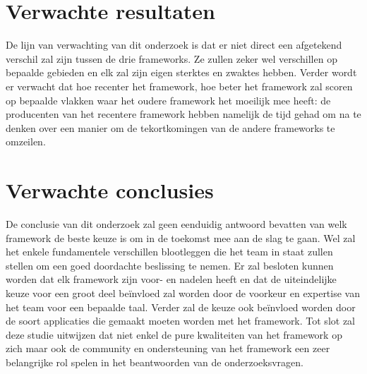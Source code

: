 \section{Verwachte resultaten}
\label{sec:verwachte_resultaten}

De lijn van verwachting van dit onderzoek is dat er niet direct een afgetekend verschil zal zijn tussen de drie frameworks. Ze zullen zeker wel verschillen op bepaalde gebieden en elk zal zijn eigen sterktes en zwaktes hebben. Verder wordt er verwacht dat hoe recenter het framework, hoe beter het framework zal scoren op bepaalde vlakken waar het oudere framework het moeilijk mee heeft: de producenten van het recentere framework hebben namelijk de tijd gehad om na te denken over een manier om de tekortkomingen van de andere frameworks te omzeilen.

\section{Verwachte conclusies}
\label{sec:verwachte_conclusies}

De conclusie van dit onderzoek zal geen eenduidig antwoord bevatten van welk framework de beste keuze is om in de toekomst mee aan de slag te gaan. Wel zal het enkele fundamentele verschillen blootleggen die het team in staat zullen stellen om een goed doordachte beslissing te nemen. Er zal besloten kunnen worden dat elk framework zijn voor- en nadelen heeft en dat de uiteindelijke keuze voor een groot deel beïnvloed zal worden door de voorkeur en expertise van het team voor een bepaalde taal. Verder zal de keuze ook beïnvloed worden door de soort applicaties die gemaakt moeten worden met het framework. Tot slot zal deze studie uitwijzen dat niet enkel de pure kwaliteiten van het framework op zich maar ook de community en ondersteuning van het framework een zeer belangrijke rol spelen in het beantwoorden van de onderzoeksvragen.

